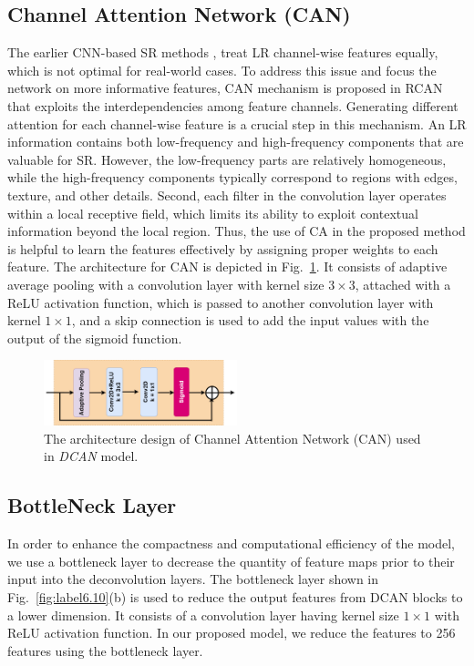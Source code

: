 \documentclass[conference]{IEEEtran}
\begin{document}
\subsection{Channel Attention Network (CAN)}
The earlier CNN-based SR methods \cite{SRCNN, VDSR, DRCN, ResNet, EDSR, SRDensenet}, treat LR channel-wise features equally, which is not optimal for real-world cases. To address this issue and focus the network on more informative features, CAN mechanism is proposed in RCAN \cite{RCAN} that exploits the interdependencies among feature channels. Generating different attention for each channel-wise feature is a crucial step in this mechanism. An LR information contains both low-frequency and high-frequency components that are valuable for SR. However, the low-frequency parts are relatively homogeneous, while the high-frequency components typically correspond to regions with edges, texture, and other details. Second, each filter in the convolution layer operates within a local receptive field, which limits its ability to exploit contextual information beyond the local region. Thus, the use of CA in the proposed method is helpful to learn the features effectively by assigning proper weights to each feature. The architecture for CAN is depicted in Fig.~\ref{fig:label6.11}. It consists of adaptive average pooling with a convolution layer with kernel size $3\times3$, attached with a ReLU activation function, which is passed to another convolution layer with kernel $1\times1$, and a skip connection is used to add the input values with the output of the sigmoid function.
\begin{figure}[h!]
    \centering
    \includegraphics[width=0.5\textwidth]{4.drawio_fff.png} %
    \caption{The architecture design of Channel Attention Network (CAN) used in \emph{DCAN} model.}
    \label{fig:label6.11}
\end{figure}


\subsection{BottleNeck Layer}
In order to enhance the compactness and computational efficiency of the model, we use a bottleneck layer to decrease the quantity of feature maps prior to their input into the deconvolution layers. The bottleneck layer shown in Fig.~\ref{fig:label6.10}(b) is used to reduce the output features from DCAN blocks to a lower dimension. It consists of a convolution layer having kernel size $1\times1$ with ReLU activation function. In our proposed model, we reduce the features to 256 features using the bottleneck layer. 
\end{document}
